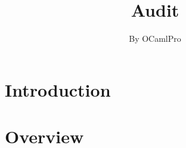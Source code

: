 \documentclass{report}
\newif\ifsolmodules
\newif\ifsolissues
\newif\ifsoldraft
\begin{document}
\title{Audit}
\author{By OCamlPro}
\maketitle
\dominitoc
\tableofcontents
\ifsolissues
\listoffigures
\fi

\ifsoldraft
\chapter*{To edit this document}

In the report.tex file, choose:
\begin{itemize}
\item{\bf \textbackslash{}soldraftfalse} to remove draft mode (watermarks, advises)
\item{\bf \textbackslash{}solmodulestrue} to display modules by chapter instead of contracts
\item{\bf \textbackslash{}soltablestrue} to display tables for parameters and returns
\item{\bf \textbackslash{}solissuesfalse} to remove the table of issues
\end{itemize}

Issues can be entered with:
\begin{itemize}
\item{\bf \textbackslash{}issueCritical\{title\}\{text\}}
\item{\bf \textbackslash{}issueMajor\{title\}\{text\}}
\item{\bf \textbackslash{}issueMinor\{title\}\{text\}}
\end{itemize}
\fi

\chapter{Introduction}


\chapter{Overview}


\ifsolmodules

\else

\fi
\end{document}
